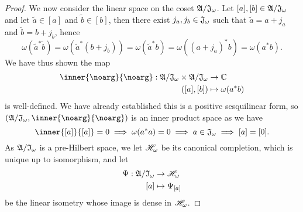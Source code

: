 \begin{proof}
    We now consider the linear space on the coset \(\mathfrak{A}/\mathfrak{J}_\omega\). Let \([a], [b] \in \mathfrak{A}/\mathfrak{J}_\omega\) and let \(\tilde{a} \in [a]\) and \(\tilde{b} \in [b]\), then there exist \(j_a, j_b \in \mathfrak{J}_\omega\) such that \(\tilde{a} = a + j_a\) and \(\tilde{b} = b + j_b\), hence
    \begin{equation*}
        \omega(\tilde{a}^*\tilde{b}) = \omega(\tilde{a}^*(b + j_b)) = \omega(\tilde{a}^*b) = \omega((a + j_a)^*b) = \omega(a^*b).
    \end{equation*}
    We have thus shown the map
    \begin{align*}
        \inner{\noarg}{\noarg} : \algebra{A}/\algebra{J}_\omega \times \algebra{A}/\algebra{J}_\omega &\to \mathbb{C}\\
        ([a],[b]) &\mapsto \omega(a^*b)
    \end{align*}
    is well-defined. We have already established this is a positive sesquilinear form, so \((\algebra{A}/\algebra{J}_\omega, \inner{\noarg}{\noarg})\) is an inner product space as we have
    \begin{equation*}
        \inner{[a]}{[a]} = 0 \implies \omega(a^*a) = 0 \implies a \in \algebra{J}_\omega \implies [a] = [0].
    \end{equation*}
    As \(\mathfrak{A}/\mathfrak{I}_{\omega}\) is a pre-Hilbert space, we let \(\mathscr{H}_\omega\) be its canonical completion, which is unique up to isomorphism, and let
    \begin{align*}
        \Psi : \mathfrak{A}/\mathfrak{I}_\omega &\to \mathscr{H}_\omega\\
                                          [a] &\mapsto \Psi_{[a]}
    \end{align*}
    be the linear isometry whose image is dense in \(\mathscr{H}_\omega\).


\end{proof}
